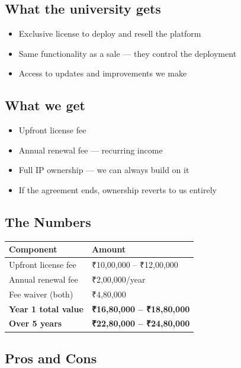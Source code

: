 \documentclass[12pt,a4paper]{article}
\begin{document}
    \vspace{0.4cm}

    \subsection*{What the university gets}
    \begin{itemize}[leftmargin=*, noitemsep]
        \item Exclusive license to deploy and resell the platform
        \item Same functionality as a sale — they control the deployment
        \item Access to updates and improvements we make
    \end{itemize}

    \subsection*{What we get}
    \begin{itemize}[leftmargin=*, noitemsep]
        \item Upfront license fee
        \item Annual renewal fee — recurring income
        \item Full IP ownership — we can always build on it
        \item If the agreement ends, ownership reverts to us entirely
    \end{itemize}

    \subsection*{The Numbers}

    \begin{tabularx}{\textwidth}{L{5cm} X}
    \toprule
    \textbf{Component} & \textbf{Amount} \\
    \midrule
    Upfront license fee & ₹10,00,000 – ₹12,00,000 \\
    Annual renewal fee & ₹2,00,000/year \\
    Fee waiver (both) & ₹4,80,000 \\
    \textbf{Year 1 total value} & \textbf{₹16,80,000 – ₹18,80,000} \\
    \textbf{Over 5 years} & \textbf{₹22,80,000 – ₹24,80,000} \\
    \bottomrule
    \end{tabularx}

    \subsection*{Pros and Cons}
\end{document}
